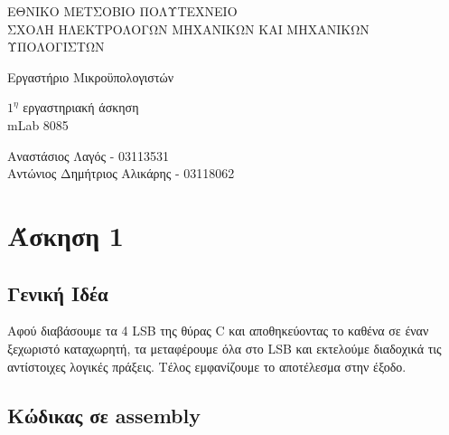 \documentclass[11pt]{article}
\begin{document}
\begin{titlepage}
	\begin{center}
		{ 
			ΕΘΝΙΚΟ ΜΕΤΣΟΒΙΟ ΠΟΛΥΤΕΧΝΕΙΟ\\
			ΣΧΟΛΗ ΗΛΕΚΤΡΟΛΟΓΩΝ ΜΗΧΑΝΙΚΩΝ ΚΑΙ ΜΗΧΑΝΙΚΩΝ ΥΠΟΛΟΓΙΣΤΩΝ
		}
		
		\vfill

		{\Large
			Εργαστήριο Μικροϋπολογιστών
		}
		
		{\large
			$1^η$ εργαστηριακή άσκηση \\ mLab 8085
		}

		\vfill

		{
			Αναστάσιος Λαγός - 03113531\\
			Αντώνιος Δημήτριος Αλικάρης - 03118062
		}
	\end{center}
\end{titlepage}


\section*{Άσκηση 1}

\subsection*{Γενική Ιδέα}

Αφού διαβάσουμε τα 4 LSB της θύρας C και αποθηκεύοντας το καθένα σε έναν ξεχωριστό καταχωρητή, τα μεταφέρουμε όλα στο LSB και εκτελούμε διαδοχικά τις αντίστοιχες λογικές πράξεις. Τέλος εμφανίζουμε το αποτέλεσμα στην έξοδο.

\subsection*{Κώδικας σε assembly}
\end{document}
